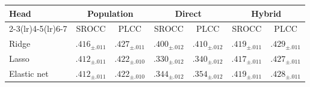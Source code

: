 \begin{tabular}{@{}l cc cc cc@{}}
\toprule
\multirow{2}{*}{Head} & \multicolumn{2}{c}{Population} & \multicolumn{2}{c}{Direct} & \multicolumn{2}{c}{Hybrid} \\
\cmidrule(lr){2-3}\cmidrule(lr){4-5}\cmidrule(lr){6-7}
& SROCC & PLCC & SROCC & PLCC & SROCC & PLCC \\
\midrule
Ridge       & $.416_{\pm .011}$ & $.427_{\pm .011}$ & $.400_{\pm .012}$ & $.410_{\pm .012}$ & $.419_{\pm .011}$ & $.429_{\pm .011}$ \\
Lasso       & $.412_{\pm .011}$ & $.422_{\pm .010}$ & $.330_{\pm .012}$ & $.340_{\pm .012}$ & $.417_{\pm .011}$ & $.427_{\pm .011}$ \\
Elastic net & $.412_{\pm .011}$ & $.422_{\pm .010}$ & $.344_{\pm .012}$ & $.354_{\pm .012}$ & $.419_{\pm .011}$ & $.428_{\pm .011}$ \\
\bottomrule
\end{tabular}
